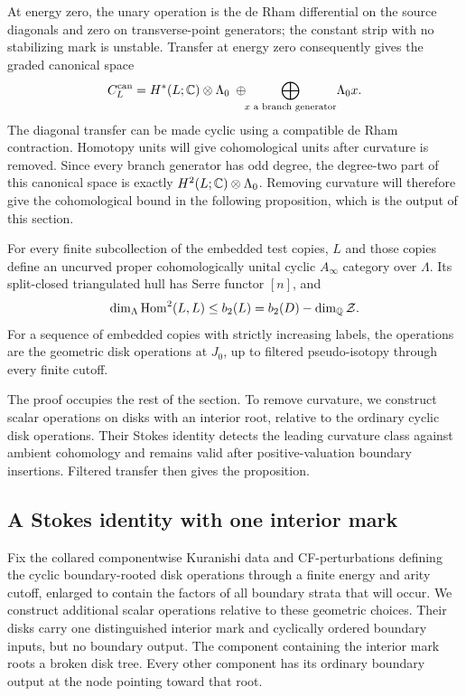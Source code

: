 At energy zero, the unary operation is the de Rham differential on
the source diagonals and zero on transverse-point generators; the
constant strip with no stabilizing mark is unstable.  Transfer at
energy zero consequently gives the graded canonical space
\begin{equation}\label{curv:canonical-space}
 C_L^{\mathrm{can}}
 =H^*(L;\mathbb C)\otimes\Lambda_0
   \;\oplus\!\!\bigoplus_{x\text{ a branch generator}}\!\Lambda_0 x.
\end{equation}
The diagonal transfer can be made cyclic using a compatible de Rham
contraction.  Homotopy units will give cohomological units after
curvature is removed.  Since every branch generator has odd degree,
the degree-two part of this canonical space is exactly
$H^2(L;\mathbb C)\otimes\Lambda_0$.  Removing curvature will therefore
give the cohomological bound in the following proposition, which is
the output of this section.

\begin{proposition}\label{prop:curvature}
For every finite subcollection of the embedded test copies, $L$ and
those copies define an uncurved proper cohomologically unital cyclic
$A_\infty$ category over $\Lambda$.  Its split-closed triangulated
hull has Serre functor $[n]$, and
\begin{equation}\label{curv:degree-two-bound}
 \dim_\Lambda \operatorname{Hom}^2(L,L)
 \leq b_2(L)=b_2(D)-\dim_\mathbb Q\mathcal Z.
\end{equation}
For a sequence of embedded copies with strictly increasing labels,
the operations are the geometric disk operations at $J_0$, up to
filtered pseudo-isotopy through every finite cutoff.
\end{proposition}

The proof occupies the rest of the section.  To remove curvature, we construct scalar operations on disks with
an interior root, relative to the ordinary cyclic disk operations.
Their Stokes identity detects the leading curvature class against
ambient cohomology and remains valid after positive-valuation
boundary insertions.  Filtered transfer then gives the proposition.

\subsection{A Stokes identity with one interior mark}

Fix the collared componentwise Kuranishi data and CF-perturbations
defining the cyclic boundary-rooted disk operations through a finite
energy and arity cutoff, enlarged to contain the factors of all
boundary strata that will occur.  We construct additional scalar
operations relative to these geometric choices.  Their disks carry one distinguished
interior mark and cyclically ordered boundary inputs, but no boundary
output.  The component containing the interior mark roots a broken
disk tree.  Every other component has its ordinary boundary output
at the node pointing toward that root.

